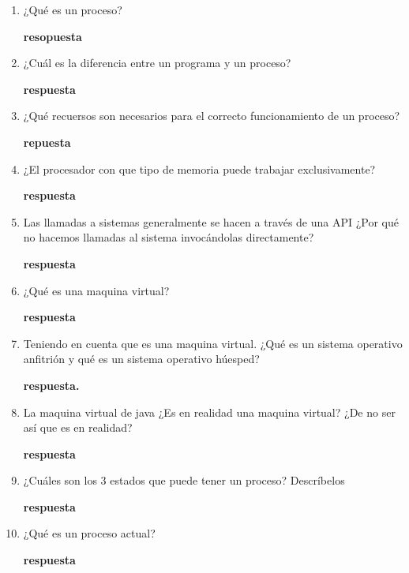 \documentclass[12pt]{article}
\begin{document}
\begin{enumerate}
    \item ¿Qué es un proceso?
    \vspace{2mm}

    \textbf{resopuesta}

    \item ¿Cuál es la diferencia entre un programa y un proceso?
    \vspace{2mm}

    \textbf{respuesta}
    \item ¿Qué recuersos son necesarios para el correcto funcionamiento de un proceso?
    \vspace{2mm}

    \textbf{repuesta}
    \item ¿El procesador con que tipo de memoria puede trabajar exclusivamente?
    \vspace{2mm}

    \textbf{respuesta}

    \item Las llamadas a sistemas generalmente se hacen a través de una API ¿Por qué no hacemos llamadas al sistema invocándolas directamente?
    \vspace{2mm}

    \textbf{respuesta}

    \item ¿Qué es una maquina virtual?
    \vspace{2mm}

    \textbf{respuesta}
    \item Teniendo en cuenta que es una maquina virtual. ¿Qué es un sistema operativo anfitrión y qué es un sistema operativo húesped?  
    \vspace{2mm}

    \textbf{respuesta.}
    \item La maquina virtual de java ¿Es en realidad una maquina virtual? ¿De no ser así que es en realidad?
    \vspace{2mm}

    \textbf{respuesta}
    \item ¿Cuáles son los 3 estados que puede tener un proceso? Descríbelos
    \vspace{2mm}

    \textbf{respuesta} 
    \item ¿Qué es un proceso actual?
    \vspace{2mm}
    
    \textbf{respuesta}

\end{enumerate}
\end{document}
